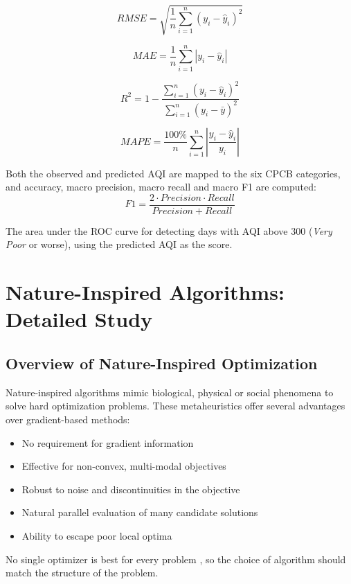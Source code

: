 \begin{equation}
RMSE = \sqrt{\frac{1}{n}\sum_{i=1}^{n}(y_i - \hat{y}_i)^2}
\end{equation}

\begin{equation}
MAE = \frac{1}{n}\sum_{i=1}^{n}|y_i - \hat{y}_i|
\end{equation}

\begin{equation}
R^2 = 1 - \frac{\sum_{i=1}^{n}(y_i - \hat{y}_i)^2}{\sum_{i=1}^{n}(y_i - \bar{y})^2}
\end{equation}

\begin{equation}
MAPE = \frac{100\%}{n}\sum_{i=1}^{n}\left|\frac{y_i - \hat{y}_i}{y_i}\right|
\end{equation}

 Both the observed and predicted AQI are mapped to the six CPCB categories, and accuracy, macro precision, macro recall and macro F1 are computed:
\begin{equation}
F1 = \frac{2 \cdot Precision \cdot Recall}{Precision + Recall}
\end{equation}

 The area under the ROC curve for detecting days with AQI above 300 (\emph{Very Poor} or worse), using the predicted AQI as the score.

\section{Nature-Inspired Algorithms: Detailed Study}

\subsection{Overview of Nature-Inspired Optimization}
Nature-inspired algorithms mimic biological, physical or social phenomena to solve hard optimization problems. These metaheuristics offer several advantages over gradient-based methods:
\begin{itemize}
\item No requirement for gradient information
\item Effective for non-convex, multi-modal objectives
\item Robust to noise and discontinuities in the objective
\item Natural parallel evaluation of many candidate solutions
\item Ability to escape poor local optima
\end{itemize}
No single optimizer is best for every problem \cite{wolpert1997}, so the choice of algorithm should match the structure of the problem.

